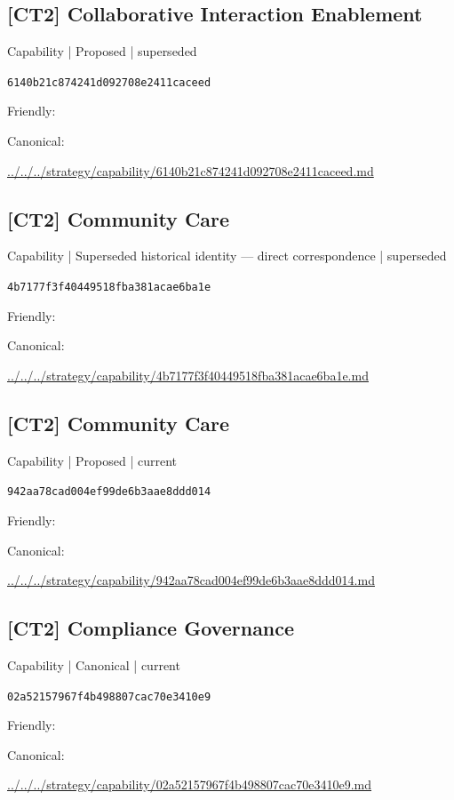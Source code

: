 \documentclass[10pt,a4paper]{article}
\begin{document}
\subsection*{[CT2] Collaborative Interaction Enablement}
{\small Capability | Proposed | superseded}\par
\texttt{6140b21c874241d092708e2411caceed}\par
Friendly: \par
Canonical: \par
{\footnotesize\url{../../../strategy/capability/6140b21c874241d092708e2411caceed.md}}\par
\subsection*{[CT2] Community Care}
{\small Capability | Superseded historical identity — direct correspondence | superseded}\par
\texttt{4b7177f3f40449518fba381acae6ba1e}\par
Friendly: \par
Canonical: \par
{\footnotesize\url{../../../strategy/capability/4b7177f3f40449518fba381acae6ba1e.md}}\par
\subsection*{[CT2] Community Care}
{\small Capability | Proposed | current}\par
\texttt{942aa78cad004ef99de6b3aae8ddd014}\par
Friendly: \par
Canonical: \par
{\footnotesize\url{../../../strategy/capability/942aa78cad004ef99de6b3aae8ddd014.md}}\par
\subsection*{[CT2] Compliance Governance}
{\small Capability | Canonical | current}\par
\texttt{02a52157967f4b498807cac70e3410e9}\par
Friendly: \par
Canonical: \par
{\footnotesize\url{../../../strategy/capability/02a52157967f4b498807cac70e3410e9.md}}\par
\end{document}
